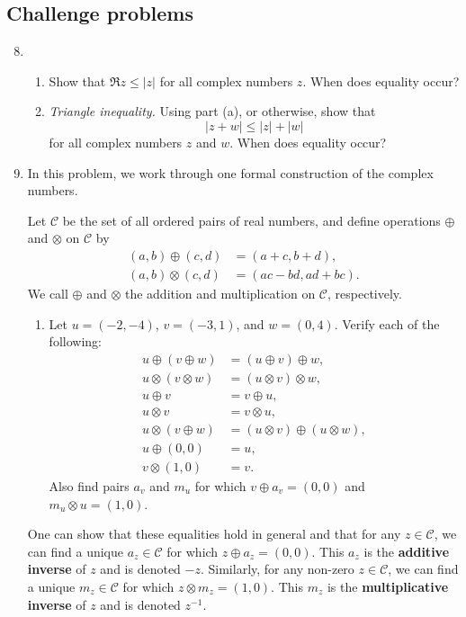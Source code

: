 \subsection{Challenge problems}

\begin{enumerate}\setcounter{enumi}{7}
\item \begin{enumerate}
\item Show that $\Re z\leq\lvert z\rvert$ for all complex numbers $z$. When does equality occur?
\item \emph{Triangle inequality.} Using part (a), or otherwise, show that
\begin{equation*}
\lvert z + w\rvert\leq\lvert z\rvert + \lvert w\rvert
\end{equation*}
for all complex numbers $z$ and $w$. When does equality occur?
\end{enumerate}
\item In this problem, we work through one formal construction of the complex numbers.\par 
Let $\mathcal{C}$ be the set of all ordered pairs of real numbers, and define operations $\oplus$ and $\otimes$ on $\mathcal{C}$ by
\begin{align*}
(a,b)\oplus (c,d) &= (a + c, b + d), \\
(a,b)\otimes (c,d) &= (ac - bd, ad + bc).
\end{align*}
We call $\oplus$ and $\otimes$ the addition and multiplication on $\mathcal{C}$, respectively.
\begin{enumerate}
\item Let $u = (-2,-4)$, $v = (-3,1)$, and $w = (0,4)$. Verify each of the following:
\begin{align*}
u\oplus (v\oplus w) &= (u\oplus v)\oplus w, \\
u\otimes (v\otimes w) &= (u\otimes v)\otimes w, \\
u\oplus v &= v\oplus u, \\
u\otimes v &= v\otimes u, \\
u\otimes (v\oplus w) &= (u\otimes v)\oplus (u\otimes w), \\
u\oplus (0,0) &= u, \\
v\otimes (1,0) &= v.
\end{align*}
Also find pairs $a_v$ and $m_u$ for which $v\oplus a_v = (0,0)$ and $m_u\otimes u = (1,0)$.
\end{enumerate}
One can show that these equalities hold in general and that for any $z\in\mathcal{C}$, we can find a unique $a_z\in\mathcal{C}$ for which $z\oplus a_z = (0,0)$. This $a_z$ is the \textbf{additive inverse} of $z$ and is denoted $-z$. Similarly, for any non-zero $z\in\mathcal{C}$, we can find a unique $m_z\in\mathcal{C}$ for which $z\otimes m_z = (1,0)$. This $m_z$ is the \textbf{multiplicative inverse} of $z$ and is denoted $z^{-1}$.\par

\end{enumerate}
